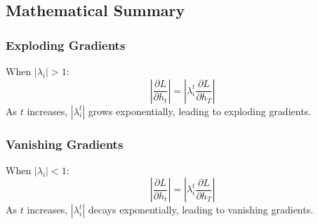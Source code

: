 \documentclass{article}
\begin{document}
\subsection*{Mathematical Summary}

\subsubsection*{Exploding Gradients}
When \( |\lambda_i| > 1 \):
\begin{equation}
\left| \frac{\partial L}{\partial h_t} \right| = \left| \lambda_i^t \frac{\partial L}{\partial h_T} \right|
\end{equation}
As \( t \) increases, \( |\lambda_i^t| \) grows exponentially, leading to exploding gradients.

\subsubsection*{Vanishing Gradients}
When \( |\lambda_i| < 1 \):
\begin{equation}
\left| \frac{\partial L}{\partial h_t} \right| = \left| \lambda_i^t \frac{\partial L}{\partial h_T} \right|
\end{equation}
As \( t \) increases, \( |\lambda_i^t| \) decays exponentially, leading to vanishing gradients.
\end{document}
